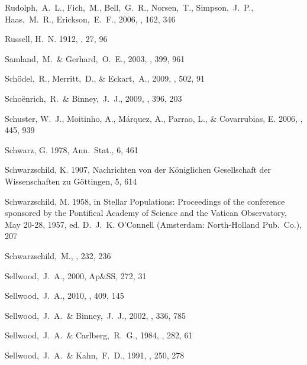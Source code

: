 \begin{thebibliography}{99}
  Rudolph,~A.~L., Fich,~M., Bell,~G.~R., Norsen,~T., Simpson,~J.~P., Haas,~M.~R., Erickson,~E.~F., 2006,
  \apjs, 162, 346

{Russell}, H.~N. 1912, \aj, 27, 96

  Samland,~M.~\& Gerhard,~O.~E., 2003,
  \aap, 399, 961

  Sch\"{o}del,~R., Merritt,~D., \& Eckart,~A., 2009, \aap, 502, 91

  Scho\"{e}nrich,~R.~\& Binney,~J.~J., 2009,
  \mnras, 396, 203

{Schuster}, W.~J., {Moitinho}, A., {M{\'a}rquez}, A., {Parrao}, L., \&
  {Covarrubias}, E. 2006, \aap, 445, 939

{Schwarz}, G. 1978, {Ann.~Stat.}, 6, 461

{Schwarzschild}, K. 1907, {Nachrichten von der K{\"o}niglichen Gesellschaft der
  Wissenschaften zu G{\"o}ttingen}, 5, {614}

{Schwarzschild}, M. 1958, in {Stellar Populations: Proceedings of the
  conference sponsored by the Pontifical Academy of Science and the Vatican
  Observatory, May 20-28, 1957}, ed. D.~J.~K. {O'Connell} ({Amsterdam}:
  {North-Holland Pub.~Co.}), 207

  Schwarzschild,~M.,
  \apj, 232, 236

  Sellwood,~J.~A., 2000,
  Ap\&SS, 272, 31

  Sellwood,~J.~A., 2010,
  \mnras, 409, 145

  Sellwood,~J.~A.~\& Binney,~J.~J., 2002,
  \mnras, 336, 785

  Sellwood,~J.~A.~\& Carlberg,~R.~G., 1984,
  \apj, 282, 61

  Sellwood,~J.~A.~\& Kahn,~F.~D., 1991,
  \mnras, 250, 278


\end{thebibliography}
